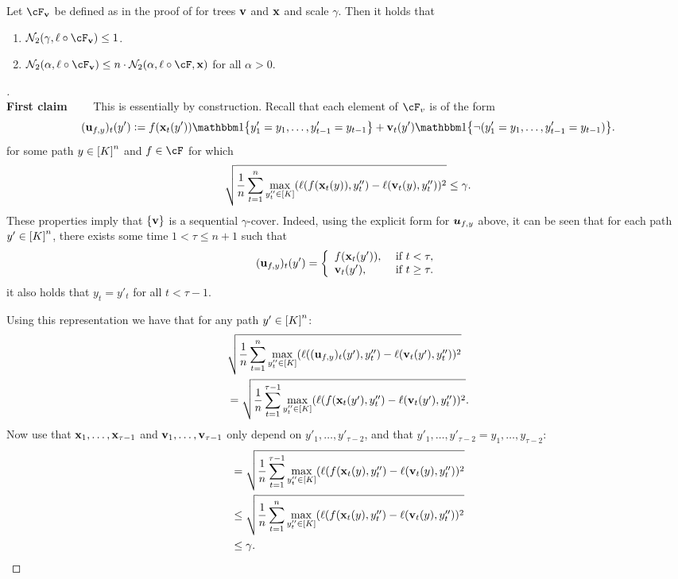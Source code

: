 \begin{lemma}
\label{lem:fv_properties}
Let $\cF_{\vv}$ be defined as in the proof of  for trees $\vv$ and $\x$ and scale $\gamma$. Then it holds that
\begin{enumerate}
\item $\mathcal{N}_2(\gamma,\ell \circ \cF_{\vv} ) \leq{} 1$.
\item $\mathcal{N}_2(\alpha,\ell \circ \cF_{\vv} ) \leq{} n\cdot{}\mathcal{N}_2(\alpha,\ell \circ \cF, \x )$ for all $\alpha>0$.
\end{enumerate}

\end{lemma}
\begin{proof}[]~\\
\textbf{First claim}~~~~
This is essentially by construction. Recall that each element of $\cF_v$ is of the form
\[
(\uu_{f,y})_{t}(y') \ldef f(\x_{t}(y'))\ind\crl*{y'_1=y_1,\ldots,y'_{t-1}=y_{t-1}} + \vv_{t}(y')\ind\crl*{\neg{}(y'_1=y_1,\ldots,y'_{t-1}=y_{t-1})}.
\]
for some path $y\in\brk*{K}^n$ and $f\in\cF$ for which
\begin{equation}
\label{eq:radius_gamma}
\sqrt{\frac{1}{n} \sum_{t=1}^n \max_{y''_t\in\brk*{K}}(\ell(f(\x_t(y)),y''_t) - \ell(\vv_t(y),y''_t) )^2} \le \gamma.
\end{equation}
These properties imply that $\crl*{\vv}$ is a sequential $\gamma$-cover. Indeed, using the explicit form for $\mb{u}_{f,y}$ above, it can be seen that for each path $y'\in\brk*{K}^{n}$, there exists some time $1<\tau\leq{}n+1$ such that
\[
(\uu_{f,y})_{t}(y') = \left\{
\begin{array}{ll}
f(\x_{t}(y')), & \textrm{ if } t < \tau,\\
\vv_{t}(y'), & \textrm{ if } t \geq{} \tau.
\end{array}
\right.
\]
it also holds that $y_{t}=y'_{t}$ for all $t<\tau-1$.

Using this representation we have that for any path $y'\in\brk*{K}^{n}$:
\begin{align*}
&\sqrt{\frac{1}{n} \sum_{t=1}^n \max_{y''_t\in\brk*{K}}(\ell((\uu_{f,y})_{t}(y'),y''_t) - \ell(\vv_t(y'),y''_t) )^2}\\
&= \sqrt{\frac{1}{n} \sum_{t=1}^{\tau-1} \max_{y''_t\in\brk*{K}}(\ell(f(\x_{t}(y'),y''_t) - \ell(\vv_t(y'),y''_t) )^2}.
\end{align*}
Now use that $\x_{1},\ldots,\x_{\tau-1}$ and $\vv_1,\ldots,\vv_{\tau-1}$ only depend on $y'_1,\ldots,y'_{\tau-2}$, and that $y'_1,\ldots,y'_{\tau-2} = y_1,\ldots,y_{\tau-2}$:
\begin{align*}
&= \sqrt{\frac{1}{n} \sum_{t=1}^{\tau-1} \max_{y''_t\in\brk*{K}}(\ell(f(\x_{t}(y),y''_t) - \ell(\vv_t(y),y''_t) )^2} \\
&\leq \sqrt{\frac{1}{n} \sum_{t=1}^{n} \max_{y''_t\in\brk*{K}}(\ell(f(\x_{t}(y),y''_t) - \ell(\vv_t(y),y''_t) )^2} \\
&\leq{} \gamma.
\end{align*}


\end{proof}
